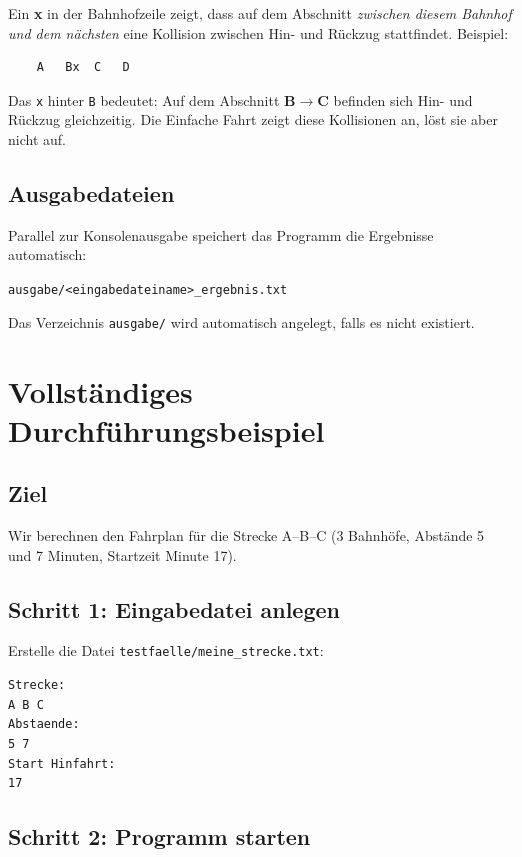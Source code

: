 \documentclass[12pt,a4paper]{article}
\begin{document}
Ein \textbf{x} in der Bahnhofzeile zeigt, dass auf dem Abschnitt \emph{zwischen diesem Bahnhof und dem nächsten} eine Kollision zwischen Hin- und Rückzug stattfindet. Beispiel:

\begin{lstlisting}
    A   Bx  C   D
\end{lstlisting}

Das \texttt{x} hinter \texttt{B} bedeutet: Auf dem Abschnitt \textbf{B$\to$C} befinden sich Hin- und Rückzug gleichzeitig. Die Einfache Fahrt zeigt diese Kollisionen an, löst sie aber nicht auf.

\subsection{Ausgabedateien}

Parallel zur Konsolenausgabe speichert das Programm die Ergebnisse automatisch:

\begin{center}
\texttt{ausgabe/<eingabedateiname>\_ergebnis.txt}
\end{center}

Das Verzeichnis \texttt{ausgabe/} wird automatisch angelegt, falls es nicht existiert.

\section{Vollständiges Durchführungsbeispiel}

\subsection{Ziel}

Wir berechnen den Fahrplan für die Strecke A--B--C (3 Bahnhöfe, Abstände 5 und 7 Minuten, Startzeit Minute 17).

\subsection{Schritt 1: Eingabedatei anlegen}

Erstelle die Datei \texttt{testfaelle/meine\_strecke.txt}:

\begin{lstlisting}
Strecke:
A B C
Abstaende:
5 7
Start Hinfahrt:
17
\end{lstlisting}

\subsection{Schritt 2: Programm starten}
\end{document}
